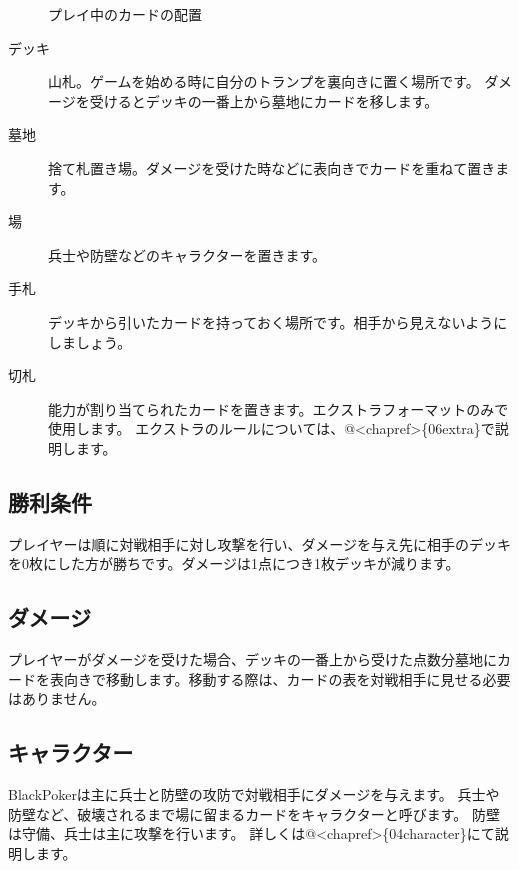 \documentclass[letterpaper,10pt,dvipdfmx]{sphinxmanual}
\begin{document}
\begin{figure}[htbp]
\centering
\capstart

\noindent{}
\caption{プレイ中のカードの配置}\label{\detokenize{common/01-base:id12}}\label{\detokenize{common/01-base:field-ex}}\end{figure}
\begin{description}
\item[{デッキ}] \leavevmode
山札。ゲームを始める時に自分のトランプを裏向きに置く場所です。
ダメージを受けるとデッキの一番上から墓地にカードを移します。

\item[{墓地}] \leavevmode
捨て札置き場。ダメージを受けた時などに表向きでカードを重ねて置きます。

\item[{場}] \leavevmode
兵士や防壁などのキャラクターを置きます。

\item[{手札}] \leavevmode
デッキから引いたカードを持っておく場所です。相手から見えないようにしましょう。

\item[{切札}] \leavevmode
能力が割り当てられたカードを置きます。エクストラフォーマットのみで使用します。
エクストラのルールについては、@\textless{}chapref\textgreater{}\{06\sphinxhyphen{}extra\}で説明します。

\end{description}


\subsection{勝利条件}
\label{\detokenize{common/01-base:id7}}
プレイヤーは順に対戦相手に対し攻撃を行い、ダメージを与え先に相手のデッキを0枚にした方が勝ちです。ダメージは1点につき1枚デッキが減ります。


\subsection{ダメージ}
\label{\detokenize{common/01-base:id8}}
プレイヤーがダメージを受けた場合、デッキの一番上から受けた点数分墓地にカードを表向きで移動します。移動する際は、カードの表を対戦相手に見せる必要はありません。


\subsection{キャラクター}
\label{\detokenize{common/01-base:id9}}
BlackPokerは主に兵士と防壁の攻防で対戦相手にダメージを与えます。
兵士や防壁など、破壊されるまで場に留まるカードをキャラクターと呼びます。
防壁は守備、兵士は主に攻撃を行います。
詳しくは@\textless{}chapref\textgreater{}\{04\sphinxhyphen{}character\}にて説明します。
\end{document}
